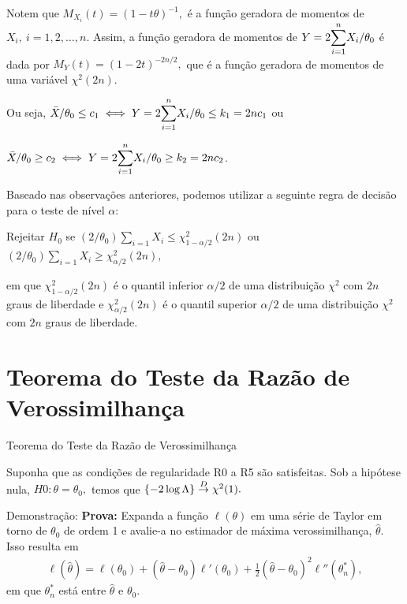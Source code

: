 \documentclass[12pt]{beamer}
\begin{document}
\begin{frame}{}
\begin{block}{}
\justifying
Notem que $M_{X_{i}}(t)=(1-t\theta)^{-1},$ é a função geradora de momentos de $X_{i},~i=1,2,\ldots,n.$ Assim, a função geradora de momentos de $Y=2{\displaystyle \sum_{i=1}^{n}} X_{i}/\theta_0$ é dada por $M_{Y}(t)=(1-2t)^{-2n/2},$ que é a função geradora de momentos de uma variável $\chi^{2}(2n).$
\end{block}
\pause
\begin{block}{}
\justifying
Ou seja, $\Bar{X}/\theta_0 \leq c_1\iff Y=2{\displaystyle \sum_{i=1}^{n}} X_{i}/\theta_0\leq k_{1}=2nc_{1}$ ou 
\end{block}
\pause
\begin{block}{}
\justifying
$\Bar{X}/\theta_0 \geq c_2\iff Y=2{\displaystyle \sum_{i=1}^{n}} X_{i}/\theta_0\geq k_{2}=2nc_{2}$.
\end{block}
\end{frame}

\begin{frame}{}
\begin{block}{}
\justifying
Baseado nas observações anteriores, podemos utilizar a seguinte regra de decisão para o teste de nível $\alpha$:
\end{block}
\pause
\begin{block}{}
\justifying
Rejeitar $H_0$ se $(2/\theta_0) \sum_{i=1} X_i \leq \chi^2_{1-\alpha/2}(2n)$ ou $(2/\theta_0) \sum_{i=1} X_i \geq \chi^2_{\alpha/2}(2n),$
\end{block}
\begin{block}{}
\justifying
em que $\chi^2_{1-\alpha/2}(2n)$ é o quantil inferior $\alpha/2$ de uma distribuição $\chi^2$ com $2n$ graus de liberdade e $\chi^2_{\alpha/2}(2n)$ é o quantil superior $\alpha/2$ de uma distribuição $\chi^2$ com $2n$ graus de liberdade.
\end{block}
\end{frame}


\section{Teorema do Teste da Razão de Verossimilhança}
\begin{frame}{Teorema do Teste da Razão de Verossimilhança}
\begin{Teorema}
\justifying
Suponha que as condições de regularidade R0 a R5 são satisfeitas. Sob a hipótese nula, $H0: \theta = \theta_0,$ temos que $\{-2 \log \Lambda\} \overset{D}{\rightarrow} \chi^2(1).$
\end{Teorema}
\pause
\begin{block}{Demonstração:}
\justifying
\textbf{Prova:} Expanda a função $\ell(\theta)$ em uma série de Taylor em torno de $\theta_0$ de ordem 1 e avalie-a no estimador de máxima verossimilhança, $\hat{\theta}$. Isso resulta em
\begin{align}\label{6.3.8}
    \ell(\hat{\theta}) = \ell(\theta_{0}) + (\hat{\theta} - \theta_0)\ell'(\theta_{0}) + \frac{1}{2}(\hat{\theta} - \theta_0)^2 \ell''(\theta^{*}_{n}),
\end{align}
em que $\theta^*_n$ está entre $\hat{\theta}$ e $\theta_0.$
\end{block}
\end{frame}
\end{document}
